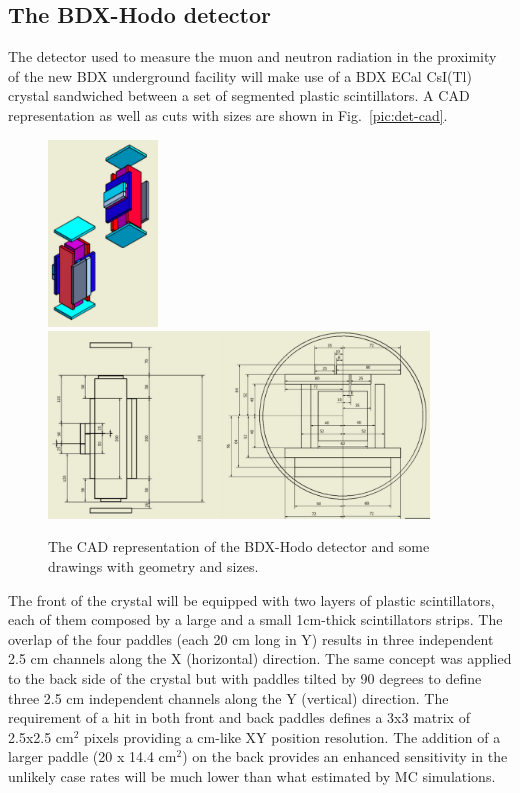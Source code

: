 \subsection{The BDX-Hodo detector}
The detector used to measure the muon and neutron radiation in the proximity of the new BDX underground facility will  make use of a BDX ECal CsI(Tl) crystal sandwiched between a set of segmented plastic scintillators.
A CAD representation as well as   cuts with sizes are shown in Fig.~\ref{pic:det-cad}.
\begin{figure}[h!] 
\center
\includegraphics[width=2.9cm]{figs/det-3d1.pdf}  
\includegraphics[width=10.1cm]{figs/det-3d2.pdf}   
\caption{The CAD representation of the BDX-Hodo detector and some drawings with geometry and sizes.}
\label{fig:det-cad}
\end{figure}
The front of the crystal will be equipped with two  layers of plastic scintillators, each of them composed by  a large and a small 1cm-thick scintillators strips. The overlap of the four paddles (each 20 cm long in Y)  results in three independent  2.5 cm channels along the X (horizontal) direction.
The same concept was applied to the  back side of the crystal but with paddles tilted by 90 degrees to define three 2.5 cm independent channels along the Y (vertical) direction. The requirement of a hit in both front and back paddles defines a 3x3 matrix of 2.5x2.5 cm$^2$ pixels providing a cm-like XY position resolution. 
The addition of a larger paddle (20 x 14.4 cm$^2$) on the back provides an enhanced sensitivity   in the unlikely  case rates will be much lower than what estimated by MC simulations.
